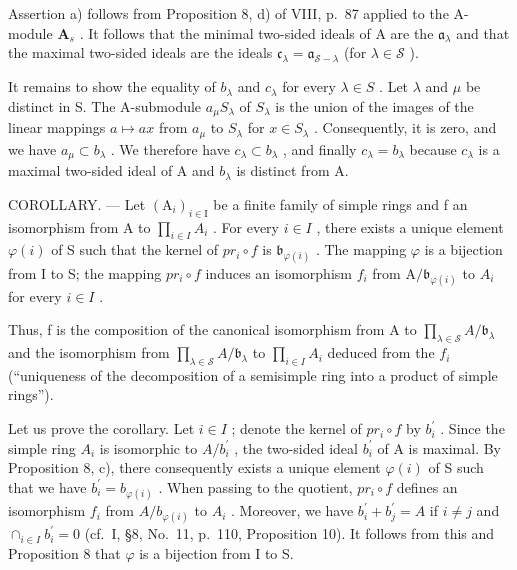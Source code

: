 Assertion a) follows from Proposition 8, d) of VIII, p.~87 applied to the A-module \(\mathbf{A}_s\) . It follows that the minimal two-sided ideals of A are the \(\mathfrak{a}_{\lambda}\) and that the maximal two-sided ideals are the ideals \(\mathfrak{c}_{\lambda} = \mathfrak{a}_{\mathcal{S} - \lambda}\) (for \(\lambda \in \mathcal{S}\) ).

It remains to show the equality of \(b_{\lambda}\) and \(c_{\lambda}\) for every \(\lambda \in S\) . Let \(\lambda\) and \(\mu\) be distinct in S. The A-submodule \(a_{\mu}S_{\lambda}\) of \(S_{\lambda}\) is the union of the images of the linear mappings \(a \mapsto ax\) from \(a_{\mu}\) to \(S_{\lambda}\) for \(x \in S_{\lambda}\) . Consequently, it is zero, and we have \(a_{\mu} \subset b_{\lambda}\) . We therefore have \(c_{\lambda} \subset b_{\lambda}\) , and finally \(c_{\lambda} = b_{\lambda}\) because \(c_{\lambda}\) is a maximal two-sided ideal of A and \(b_{\lambda}\) is distinct from A.

COROLLARY. --- Let \((\mathrm{A}_{i})_{i\in\mathrm{I}}\) be a finite family of simple rings and f an isomorphism from A to \(\prod_{i\in I}A_{i}\) . For every \(i\in I\) , there exists a unique element \(\varphi(i)\) of S such that the kernel of \(pr_{i}\circ f\) is \(\mathfrak{b}_{\varphi(i)}\) . The mapping \(\varphi\) is a bijection from I to S; the mapping \(pr_{i}\circ f\) induces an isomorphism \(f_{i}\) from \(\mathrm{A}/\mathfrak{b}_{\varphi(i)}\) to \(A_{i}\) for every \(i\in I\) .

Thus, f is the composition of the canonical isomorphism from A to \(\prod_{\lambda\in\mathscr{S}}A/\mathfrak{b}_{\lambda}\) and the isomorphism from \(\prod_{\lambda\in\mathscr{S}}A/\mathfrak{b}_{\lambda}\) to \(\prod_{i\in I}A_{i}\) deduced from the \(f_{i}\) (``uniqueness of the decomposition of a semisimple ring into a product of simple rings'').

Let us prove the corollary. Let \(i \in I\) ; denote the kernel of \(pr_{i} \circ f\) by \(b_{i}^{\prime}\) . Since the simple ring \(A_{i}\) is isomorphic to \(A/b_{i}^{\prime}\) , the two-sided ideal \(b_{i}^{\prime}\) of A is maximal. By Proposition 8, c), there consequently exists a unique element \(\varphi(i)\) of S such that we have \(b_{i}^{\prime} = b_{\varphi(i)}\) . When passing to the quotient, \(pr_{i} \circ f\) defines an isomorphism \(f_{i}\) from \(A/b_{\varphi(i)}\) to \(A_{i}\) . Moreover, we have \(b_{i}^{\prime} + b_{j}^{\prime} = A\) if \(i \neq j\) and \(\cap_{i \in I} b_{i}^{\prime} = 0\) (cf.~I, §8, No.~11, p.~110, Proposition 10). It follows from this and Proposition 8 that \(\varphi\) is a bijection from I to S.

